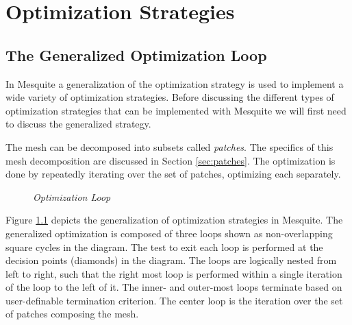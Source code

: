 \chapter{Optimization Strategies \label{ch:optstrat}}

\section{The Generalized Optimization Loop}

In Mesquite a generalization of the optimization strategy is used to implement a wide variety of optimization strategies.  Before discussing the different types of optimization strategies that can be implemented with Mesquite we will first need to discuss the generalized strategy.

The mesh can be decomposed into subsets called {\em patches}.  The specifics of this mesh decomposition are discussed in Section \ref{sec:patches}.  The optimization is done by repeatedly iterating over the set of patches, optimizing each separately.

\begin{figure}[htb!]
\begin{center}
\noindent{}
\caption{\em Optimization Loop \label{fig:genoptloop}}
\end{center}
\end{figure}

Figure \ref{fig:genoptloop} depicts the generalization of optimization strategies in Mesquite.  The generalized optimization is composed of three loops shown as non-overlapping square cycles in the diagram.  The test to exit each loop is performed at the decision points (diamonds) in the diagram.  The loops are logically nested from left to right, such that the right most loop is performed within a single iteration of the loop to the left of it.  The inner- and outer-most loops terminate based on user-definable termination criterion.  The center loop is the iteration over the set of patches composing the mesh.

